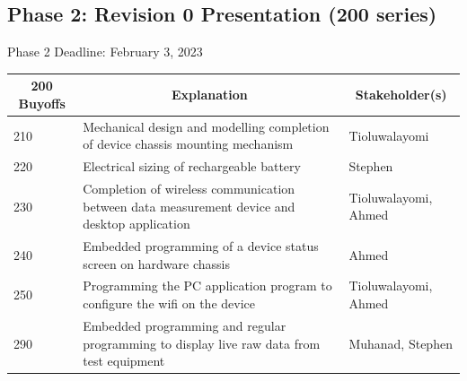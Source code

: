 \documentclass[12pt]{article}
\begin{document}
\newpage
\noindent
\subsection{Phase 2: Revision 0 Presentation (200 series)}
Phase 2 Deadline: February 3, 2023\\

\begin{table}[H]
  \centering
  \begin{tabular}{|p{2cm}|p{10cm}|p{2cm}|}
  \hline
  \multicolumn{1}{|c|}{\textbf{200 Buyoffs}} & \multicolumn{1}{c|}{\textbf{Explanation}} & \multicolumn{1}{|c|}{\textbf{Stakeholder(s)}}
  \\ \hline
  210
  & Mechanical design and modelling completion of device chassis mounting mechanism
  & Tioluwalayomi
  \newline                                
  \\ \hline

  220
  & Electrical sizing of rechargeable battery
  & Stephen
  \newline                                
  \\ \hline

  230                              
  & Completion of wireless communication between data measurement device and desktop application 
  & Tioluwalayomi, Ahmed
  \newline                                
  \\ \hline

  240
  & Embedded programming of a device status screen on hardware chassis 
  & Ahmed
  \newline                                
  \\ \hline

  250                          
  & Programming the PC application program to configure the wifi on the device
  & Tioluwalayomi, Ahmed
  \newline                                
  \\ \hline

  290                                
  & Embedded programming and regular programming to display live raw data from test equipment
  & Muhanad, Stephen 
  \newline                            
  \\ \hline

  \end{tabular}
\end{table}
\newpage
\end{document}
